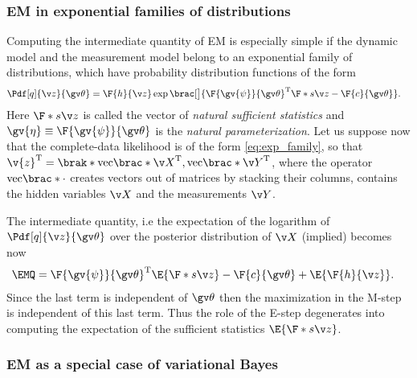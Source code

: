 \subsubsection{EM in exponential families of distributions}

Computing the intermediate quantity of EM is especially simple
if the dynamic model and the measurement model belong to an exponential
family of distributions, which have probability distribution functions of the form 
\begin{align}
	\Pdf[q]{\z}{\Th}&=\F{h}{\z}\exp\brac[\big]{ \F{\gv{\psi}}{\Th}^\tr \F*{s}{\z}-\F{c}{\Th}}.
	\label{eq:exp_family}
\end{align}
Here $\F*{s}{\z}$ is called the vector of \emph{natural sufficient statistics} and
$\gv{\eta}\equiv \F{\gv{\psi}}{\Th}$ is the \emph{natural parameterization}.
Let us suppose now that the complete-data likelihood is of the form \eqref{eq:exp_family}, so
that $\v{z}^\tr=\brak*{\mathrm{vec}\brac*{\X}^\tr,\mathrm{vec}\brac*{\Y}^\tr}$, where the operator $\mathrm{vec}\brac*{\cdot}$
creates vectors out of matrices by stacking their columns, contains the
hidden variables $\X$ and the measurements $\Y$. 

The intermediate quantity, i.e the expectation of the logarithm of $\Pdf[q]{\z}{\Th}$ over the posterior distribution of 
$\X$ (implied) becomes now
\begin{align}
	\EMQ&=	\F{\gv{\psi}}{\Th}^\tr \E{\F*{s}{\z}}-\F{c}{\Th}+\E{\F{h}{\z}}.
\end{align}
Since the last term is independent of $\Th$ then the maximization in the M-step
is independent of this last term. Thus the role of the E-step degenerates into computing the
expectation of the sufficient statistics $\E{\F*{s}{\z}}$.


\subsubsection{EM as a special case of variational Bayes}

